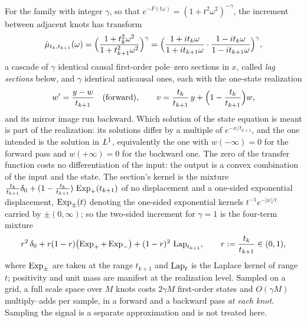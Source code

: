 \begin{proposition}
\label{prop:matern-cascade}
For the \Matern{} family with integer $\gamma$, so that $e^{-F(t\omega)} =
(1+t^2\omega^2)^{-\gamma}$, the increment between adjacent knots has transform
\begin{equation}\label{eq:matern-increment}
  \hat\mu_{t_k,t_{k+1}}(\omega)
  = \Bigl(\frac{1 + t_k^2\omega^2}{1 + t_{k+1}^2\omega^2}\Bigr)^{\gamma}
  = \Bigl(\frac{1 + it_k\omega}{1 + it_{k+1}\omega}\cdot
          \frac{1 - it_k\omega}{1 - it_{k+1}\omega}\Bigr)^{\gamma},
\end{equation}
a cascade of $\gamma$ identical causal first-order pole--zero sections in $x$, called \emph{lag
sections} below, and $\gamma$ identical anticausal ones, each with the one-state realization
\[
  w' = \frac{y - w}{t_{k+1}} \quad(\text{forward}),
  \qquad
  v = \frac{t_k}{t_{k+1}}\,y + \Bigl(1 - \frac{t_k}{t_{k+1}}\Bigr) w,
\]
and its mirror image run backward. Which solution of the state equation is meant is part of the
realization: its solutions differ by a multiple of $e^{-x/t_{k+1}}$, and the one intended is the
solution in $L^1$, equivalently the one with $w(-\infty) = 0$ for the forward pass and
$w(+\infty) = 0$ for the backward one. The zero of
the transfer function costs no differentiation of
the input: the output is a convex combination of the input and the state. The section's kernel is
the mixture
$\tfrac{t_k}{t_{k+1}}\delta_0 + (1 - \tfrac{t_k}{t_{k+1}})\,\operatorname{Exp}_{+}(t_{k+1})$ of no
displacement and a one-sided exponential displacement, $\operatorname{Exp}_{\pm}(t)$ denoting the one-sided
exponential kernels $t^{-1}e^{-|x|/t}$ carried by $\pm(0,\infty)$; so the two-sided increment for
$\gamma = 1$ is the four-term mixture
\begin{equation}\label{eq:four-term}
  r^2\,\delta_0 + r(1-r)\bigl(\operatorname{Exp}_+ + \operatorname{Exp}_-\bigr) + (1-r)^2\,\operatorname{Lap}_{t_{k+1}},
  \qquad r := \frac{t_k}{t_{k+1}} \in (0,1),
\end{equation}
where $\operatorname{Exp}_\pm$ are taken at the range $t_{k+1}$ and $\operatorname{Lap}_t$ is the Laplace kernel of range
$t$; positivity and unit mass are manifest at the
realization level. Sampled on a grid, a full scale space over $M$ knots costs $2\gamma M$
first-order states and $O(\gamma M)$ multiply--adds per sample, in a forward and a backward pass
\emph{at each knot}. Sampling the signal
is a separate approximation and is not treated here.
\statusT
\end{proposition}

